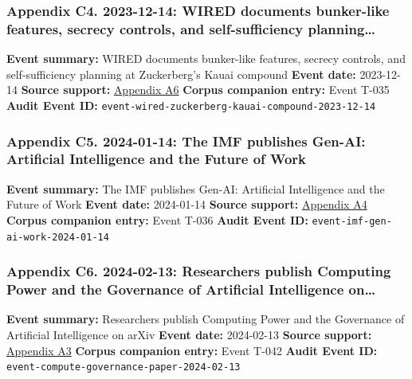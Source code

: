 \documentclass[
  american,
  11pt,
  letterpaper,
]{article}
\begin{document}
\subsubsection{Appendix C4. 2023-12-14: WIRED documents bunker-like
features, secrecy controls, and self-sufficiency
planning\ldots{}}\label{appendix-c4-2023-12-14-wired-documents-bunker-like-features-secrecy-controls-and-self-sufficiency-planning-at-zuckerberg-s-kauai-compound}

\textbf{Event summary:} WIRED documents bunker-like features, secrecy
controls, and self-sufficiency planning at Zuckerberg's Kauai compound
\textbf{Event date:} 2023-12-14 \textbf{Source support:}
\hyperref[appendix-a6-inside-mark-zuckerbergs-top-secret-hawaii-compound]{Appendix
A6} \textbf{Corpus companion entry:} Event T-035 \textbf{Audit Event
ID:} \texttt{event-wired-zuckerberg-kauai-compound-2023-12-14}

\subsubsection{Appendix C5. 2024-01-14: The IMF publishes Gen-AI:
Artificial Intelligence and the Future of
Work}\label{appendix-c5-2024-01-14-the-imf-publishes-gen-ai-artificial-intelligence-and-the-future-of-work}

\textbf{Event summary:} The IMF publishes Gen-AI: Artificial
Intelligence and the Future of Work \textbf{Event date:} 2024-01-14
\textbf{Source support:}
\hyperref[appendix-a4-gen-ai-artificial-intelligence-and-the-future-of-work]{Appendix
A4} \textbf{Corpus companion entry:} Event T-036 \textbf{Audit Event
ID:} \texttt{event-imf-gen-ai-work-2024-01-14}

\subsubsection{Appendix C6. 2024-02-13: Researchers publish Computing
Power and the Governance of Artificial Intelligence
on\ldots{}}\label{appendix-c6-2024-02-13-researchers-publish-computing-power-and-the-governance-of-artificial-intelligence-on-arxiv}

\textbf{Event summary:} Researchers publish Computing Power and the
Governance of Artificial Intelligence on arXiv \textbf{Event date:}
2024-02-13 \textbf{Source support:}
\hyperref[appendix-a3-computing-power-and-the-governance-of-artificial-intelligence]{Appendix
A3} \textbf{Corpus companion entry:} Event T-042 \textbf{Audit Event
ID:} \texttt{event-compute-governance-paper-2024-02-13}
\end{document}
